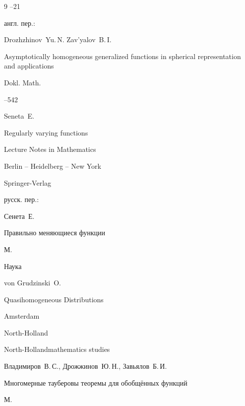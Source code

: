 \begin{thebibliography}{9}
--21

\transl англ. пер.:~

\by Drozhzhinov~Yu.\,N. Zav'yalov~B.\,I.

\paper Asymptotically homogeneous generalized functions in spherical representation and applications

\jour Dokl. Math.



--542 





\by Seneta~E.

\book Regularly varying functions

\serial Lecture Notes in Mathematics


\publaddr Berlin -- Heidelberg -- New York

\publ Springer-Verlag



\rtransl русск. пер.:~

\by Сенета~Е.

\book Правильно меняющиеся функции

\publaddr М. 

\publ Наука 






\by  von Grudzinski~O.

\book Quasihomogeneous Distributions

\publaddr Amsterdam

\publ North-Holland

\serial North-Hollandmathematics studies 









\by  Владимиров~В.\,С., Дрожжинов~Ю.\,Н., Завьялов~Б.\,И.

\book  Многомерные тауберовы теоремы для обобщённых функций

\publaddr М.


\end{thebibliography}

